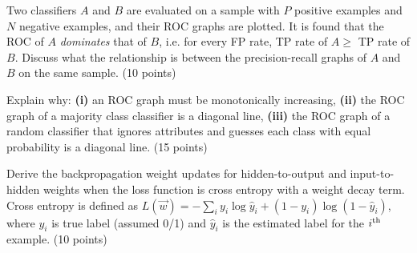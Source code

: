 \documentclass[fleqn]{homework}
\begin{document}
  \begin{problem}{3}
    \begin{question}
      Two classifiers $A$ and $B$ are evaluated on a sample with $P$ positive
      examples and $N$ negative examples, and their ROC graphs are plotted.  It
      is found that the ROC of $A$ \textit{dominates} that of $B$, i.e. for
      every FP rate, TP rate of $A \ge$ TP rate of $B$.  Discuss what the
      relationship is between the precision-recall graphs of $A$ and $B$ on the
      same sample. (10 points)
    \end{question}
  \end{problem}

  \begin{problem}{4}
    \begin{question}
      Explain why: \textbf{(i)} an ROC graph must be monotonically increasing,
      \textbf{(ii)} the ROC graph of a majority class classifier is a diagonal
      line, \textbf{(iii)} the ROC graph of a random classifier that ignores
      attributes and guesses each class with equal probability is a diagonal
      line. (15 points)
    \end{question}
  \end{problem}

  \begin{problem}{5}
    \begin{question}
      Derive the backpropagation weight updates for hidden-to-output and
      input-to-hidden weights when the loss function is cross entropy with a
      weight decay term.  Cross entropy is defined as
      $L(\vec{w}) = -\sum_i y_i \log \hat{y}_i + (1-y_i)\log(1-\hat{y}_i)$,
      where $y_i$ is true label (assumed 0/1) and $\hat{y}_i$ is the estimated
      label for the $i\textsuperscript{th}$ example. (10 points)
    \end{question}
  \end{problem}
\end{document}
